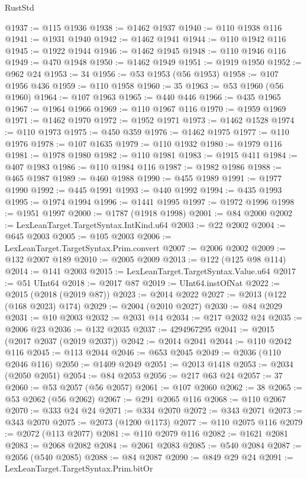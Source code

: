 \begin{lexlean}{RustStd}
\begin{coremodule}
{\begin{coremodule}
{{{{{{{{{{{{{{{{{{{{{{{{{{{{{{{{{{{{{{{{{{{{{{{@1937 := @115 @1936
@1938 := @1462 @1937
@1940 := @110 @1938 @116
@1941 := @1931 @1940
@1942 := @1462 @1941
@1944 := @110 @1942 @116
@1945 := @1922 @1944
@1946 := @1462 @1945
@1948 := @110 @1946 @116
@1949 := @470 @1948
@1950 := @1462 @1949
@1951 := @1919 @1950
@1952 := @962 @24
@1953 := 34
@1956 := @53 @1953 (@56 @1953)
@1958 := @107 @1956 @436
@1959 := @110 @1958
@1960 := 35
@1963 := @53 @1960 (@56 @1960)
@1964 := @107 @1963
@1965 := @440 @446
@1966 := @435 @1965
@1967 := @1964 @1966
@1969 := @110 @1967 @116
@1970 := @1959 @1969
@1971 := @1462 @1970
@1972 := @1952 @1971
@1973 := @1462 @1528
@1974 := @110 @1973
@1975 := @450 @359
@1976 := @1462 @1975
@1977 := @110 @1976
@1978 := @107 @1635
@1979 := @110 @1932
@1980 := @1979 @116
@1981 := @1978 @1980
@1982 := @110 @1981
@1983 := @1915 @411
@1984 := @407 @1983
@1986 := @110 @1984 @116
@1987 := @1982 @1986
@1988 := @465 @1987
@1989 := @460 @1988
@1990 := @455 @1989
@1991 := @1977 @1990
@1992 := @445 @1991
@1993 := @440 @1992
@1994 := @435 @1993
@1995 := @1974 @1994
@1996 := @1441 @1995
@1997 := @1972 @1996
@1998 := @1951 @1997
@2000 := @1787 (@1918 @1998)
@2001 := @84 @2000
@2002 := LexLeanTarget.TargetSyntax.IntKind.u64
@2003 := @22 @2002
@2004 := @645 @2003
@2005 := @105 @2003
@2006 := LexLeanTarget.TargetSyntax.Prim.convert
@2007 := @2006 @2002
@2009 := @132 @2007 @189
@2010 := @2005 @2009
@2013 := @122 (@125 @98 @114)
@2014 := @141 @2003
@2015 := LexLeanTarget.TargetSyntax.Value.u64
@2017 := @51 UInt64
@2018 := @2017 @87
@2019 := UInt64.instOfNat
@2022 := @2015 (@2018 (@2019 @87))
@2023 := @2014 @2022
@2027 := @2013 (@122 (@168 @2023) @174)
@2029 := @2004 (@2010 @2027)
@2030 := @84 @2029
@2031 := @10 @2003
@2032 := @2031 @14
@2034 := @217 @2032 @24
@2035 := @2006 @23
@2036 := @132 @2035
@2037 := 4294967295
@2041 := @2015 (@2017 @2037 (@2019 @2037))
@2042 := @2014 @2041
@2044 := @110 @2042 @116
@2045 := @113 @2044
@2046 := @653 @2045
@2049 := @2036 (@110 @2046 @116)
@2050 := @1409 @2049
@2051 := @2013 @1418
@2053 := @2034 (@2050 @2051)
@2054 := @84 @2053
@2056 := @217 @63 @24
@2057 := 37
@2060 := @53 @2057 (@56 @2057)
@2061 := @107 @2060
@2062 := 38
@2065 := @53 @2062 (@56 @2062)
@2067 := @291 @2065 @116
@2068 := @110 @2067
@2070 := @333 @24 @24
@2071 := @334 @2070
@2072 := @343 @2071
@2073 := @343 @2070
@2075 := @2073 (@1200 @1173)
@2077 := @110 @2075 @116
@2079 := @2072 (@113 @2077)
@2081 := @110 @2079 @116
@2082 := @1621 @2081
@2083 := @2068 @2082
@2084 := @2061 @2083
@2085 := @540 @2084
@2087 := @2056 (@540 @2085)
@2088 := @84 @2087
@2090 := @849 @29 @24
@2091 := LexLeanTarget.TargetSyntax.Prim.bitOr
}}}}}}}}}}}}}}}}}}}}}}}}}}}}}}}}}}}}}}}}}}}}}}}
\end{coremodule}}
\end{coremodule}
\end{lexlean}
